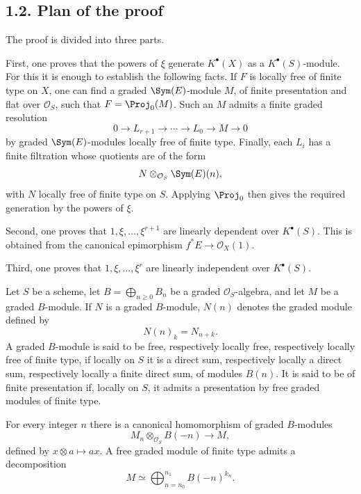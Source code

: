 \documentclass[11pt]{article}
\begin{document}
\subsection*{1.2. Plan of the proof}
The proof is divided into three parts.

First, one proves that the powers of \(\xi\) generate \(K^\bullet(X)\) as a \(K^\bullet(S)\)-module. For this it is enough to establish the following facts. If \(F\) is locally free of finite type on \(X\), one can find a graded \(\Sym(E)\)-module \(M\), of finite presentation and flat over \(\mathcal O_S\), such that \(F=\Proj_0(M)\). Such an \(M\) admits a finite graded resolution
\[
  0\longrightarrow L_{r+1}\longrightarrow \cdots \longrightarrow L_0\longrightarrow M\longrightarrow 0
\]
by graded \(\Sym(E)\)-modules locally free of finite type. Finally, each \(L_i\) has a finite filtration whose quotients are of the form
\[
  N\otimes_{\mathcal O_S}\Sym(E)(n),
\]
with \(N\) locally free of finite type on \(S\). Applying \(\Proj_0\) then gives the required generation by the powers of \(\xi\).

Second, one proves that \(1,\xi,\ldots,\xi^{r+1}\) are linearly dependent over \(K^\bullet(S)\). This is obtained from the canonical epimorphism \(f^*E\to\mathcal O_X(1)\).

Third, one proves that \(1,\xi,\ldots,\xi^r\) are linearly independent over \(K^\bullet(S)\).

Let \(S\) be a scheme, let \(B=\bigoplus_{n\geq 0}B_n\) be a graded \(\mathcal O_S\)-algebra, and let \(M\) be a graded \(B\)-module. If \(N\) is a graded \(B\)-module, \(N(n)\) denotes the graded module defined by
\[
  N(n)_k=N_{n+k}.
\]
A graded \(B\)-module is said to be free, respectively locally free, respectively locally free of finite type, if locally on \(S\) it is a direct sum, respectively locally a direct sum, respectively locally a finite direct sum, of modules \(B(n)\). It is said to be of finite presentation if, locally on \(S\), it admits a presentation by free graded modules of finite type.

For every integer \(n\) there is a canonical homomorphism of graded \(B\)-modules
\begin{equation}\tag{1.2.1}
  M_n\otimes_{\mathcal O_S}B(-n)\longrightarrow M,
\end{equation}
defined by \(x\otimes a\mapsto ax\). A free graded module of finite type admits a decomposition
\begin{equation}\tag{1.2.2}
  M\simeq \bigoplus_{n=n_0}^{n_1} B(-n)^{k_n}.
\end{equation}
\end{document}
